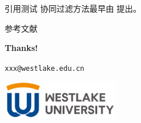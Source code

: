 \documentclass[11pt]{beamer}
\makeatletter
\newcommand{\email}{xxx@westlake.edu.cn}
\makeatother
\begin{document}

\begin{frame}{引用测试}
  协同过滤方法最早由 \cite{hu2008collaborative}提出。
\end{frame}



    
% 
% 

\begin{frame}[allowframebreaks]{参考文献}
  
  
\end{frame}



\begin{frame}
  \centering
  \vspace{1cm}
  
  {\textbf{Thanks!}}
  
  \vspace{1cm}
  
  \texttt{\email}
  
  \vspace{0.8cm}
  
  \includegraphics[width=5cm]{./pic/logo3.png}
  
\end{frame}

    
\end{document}
